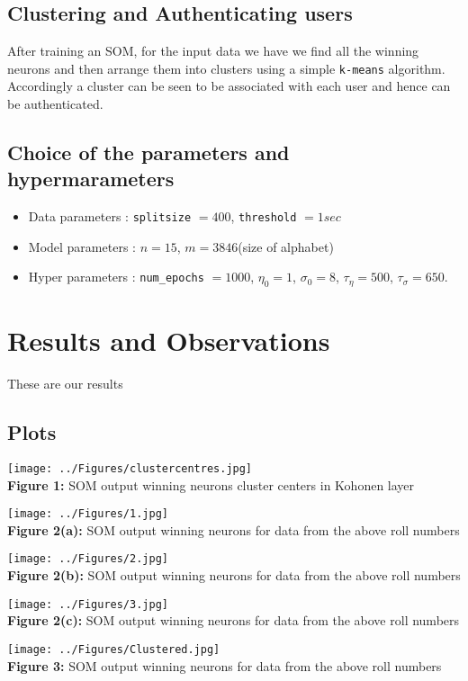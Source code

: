 \documentclass[a4paper,10pt]{article}
\begin{document}
\subsection{Clustering and Authenticating users}
After training an SOM, for the input data we have we find all the winning neurons and then arrange them into clusters using a simple \texttt{k-means} algorithm. Accordingly a cluster can be seen to be associated with each user and hence can be authenticated.

\subsection{Choice of the parameters and hypermarameters}
\begin{itemize}
	\item Data parameters : \texttt{splitsize} $= 400$, \texttt{threshold} $= 1 sec$
	\item Model parameters : $n=15$, $m=3846$(size of alphabet)
	\item Hyper parameters : \texttt{num\_epochs} $= 1000$, $\eta_0 = 1$, $\sigma_0 = 8$, $\tau_\eta = 500$, $\tau_\sigma = 650$.
\end{itemize}

\section{Results and Observations}

These are our results

\subsection*{Plots}
\begin{center}
	\texttt{[image: ../Figures/clustercentres.jpg]} \\
	\small{\textbf{Figure 1:} SOM output winning neurons cluster centers in Kohonen layer} \\
\end{center}
\begin{center}
	\texttt{[image: ../Figures/1.jpg]} \\
	\small{\textbf{Figure 2(a):} SOM output winning neurons for data from the above roll numbers} \\
\end{center}
\begin{center}
	\texttt{[image: ../Figures/2.jpg]} \\
	\small{\textbf{Figure 2(b):} SOM output winning neurons for data from the above roll numbers}
\end{center}
\begin{center}
	\texttt{[image: ../Figures/3.jpg]} \\
	\small{\textbf{Figure 2(c):} SOM output winning neurons for data from the above roll numbers}
\end{center}
\begin{center}
	\texttt{[image: ../Figures/Clustered.jpg]} \\
	\small{\textbf{Figure 3:} SOM output winning neurons for data from the above roll numbers}
\end{center}
\end{document}
